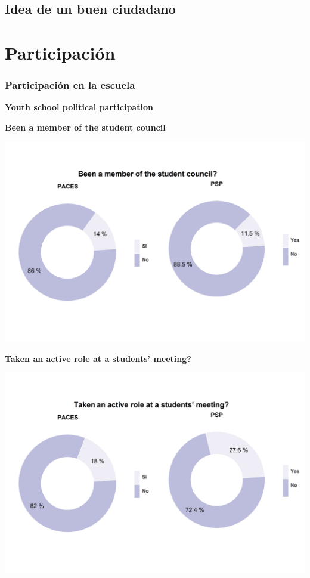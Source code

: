 \documentclass[12pt,twoside]{templates/facsothesis}
\begin{document}
\hypertarget{idea-de-un-buen-ciudadano}{%
\subsection{Idea de un buen ciudadano}\label{idea-de-un-buen-ciudadano}}

\hypertarget{participaciuxf3n}{%
\section{Participación}\label{participaciuxf3n}}

\hypertarget{participaciuxf3n-en-la-escuela}{%
\subsubsection{Participación en la escuela}\label{participaciuxf3n-en-la-escuela}}

\textbf{Youth school political participation}

\textbf{Been a member of the student council}

\includegraphics{output/plottr.png}

\textbf{Taken an active role at a students' meeting?}

\includegraphics{output/plottr2.png}
\end{document}
